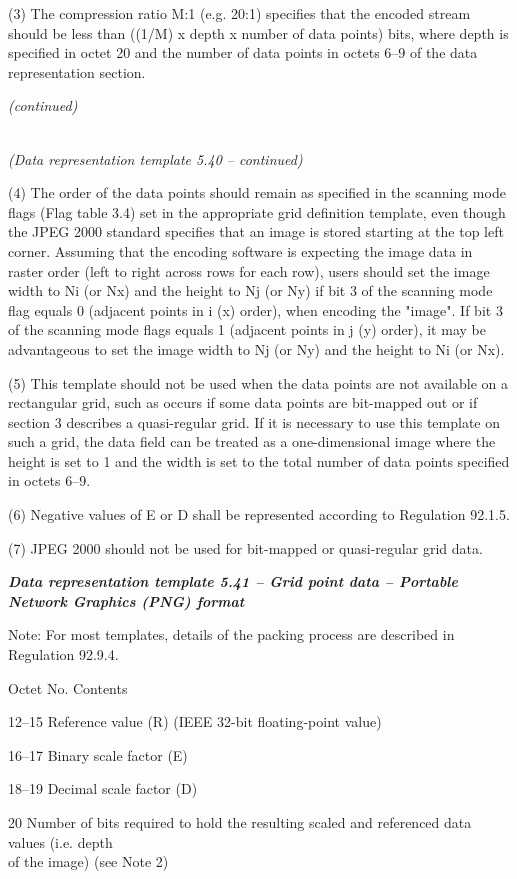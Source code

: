 (3) The compression ratio M:1 (e.g. 20:1) specifies that the encoded stream should be less than ((1/M) x depth x number of data points) bits, where depth is specified in octet 20 and the number of data points in octets 6--9 of the data representation section.

\emph{(continued)}

\emph{\\
(Data representation template 5.40 -- continued)}

(4) The order of the data points should remain as specified in the scanning mode flags (Flag table 3.4) set in the appropriate grid definition template, even though the JPEG 2000 standard specifies that an image is stored starting at the top left corner. Assuming that the encoding software is expecting the image data in raster order (left to right across rows for each row), users should set the image width to Ni (or Nx) and the height to Nj (or Ny) if bit 3 of the scanning mode flag equals 0 (adjacent points in i (x) order), when encoding the "image". If bit 3 of the scanning mode flags equals 1 (adjacent points in j (y) order), it may be advantageous to set the image width to Nj (or Ny) and the height to Ni (or Nx).

(5) This template should not be used when the data points are not available on a rectangular grid, such as occurs if some data points are bit-mapped out or if section 3 describes a quasi-regular grid. If it is necessary to use this template on such a grid, the data field can be treated as a one-dimensional image where the height is set to 1 and the width is set to the total number of data points specified in octets 6--9.

(6) Negative values of E or D shall be represented according to Regulation 92.1.5.

(7) JPEG 2000 should not be used for bit-mapped or quasi-regular grid data.

\emph{\textbf{Data representation template 5.41 -- Grid point data -- Portable Network Graphics (PNG) format}}

Note: For most templates, details of the packing process are described in Regulation 92.9.4.

Octet No. Contents

12--15 Reference value (R) (IEEE 32-bit floating-point value)

16--17 Binary scale factor (E)

18--19 Decimal scale factor (D)

20 Number of bits required to hold the resulting scaled and referenced data values (i.e. depth\\
of the image) (see Note 2)

